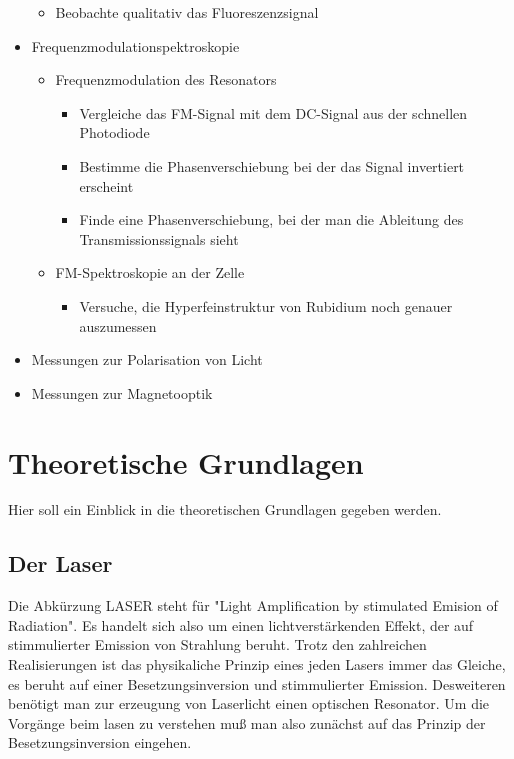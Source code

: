 \documentclass[12pt]{article}
\begin{document}
\begin{itemize}
\begin{itemize}
   \item Beobachte qualitativ das Fluoreszenzsignal
  \end{itemize}
 \item Frequenzmodulationspektroskopie
  \begin{itemize}
   \item Frequenzmodulation des Resonators
  \begin{itemize}
   \item Vergleiche das FM-Signal mit dem DC-Signal aus der schnellen Photodiode
   \item Bestimme die Phasenverschiebung bei der das Signal invertiert erscheint
   \item Finde eine Phasenverschiebung, bei der man die Ableitung des Transmissionssignals sieht
  \end{itemize}
   \item FM-Spektroskopie an der Zelle
  \begin{itemize}
   \item Versuche, die Hyperfeinstruktur von Rubidium noch genauer auszumessen
  \end{itemize}
  \end{itemize}
  \item Messungen zur Polarisation von Licht
  \item Messungen zur Magnetooptik
\end{itemize}
\newpage

\section{Theoretische Grundlagen}
Hier soll ein Einblick in die theoretischen Grundlagen gegeben werden.
\subsection{Der Laser}
Die Abkürzung LASER steht für "Light Amplification by stimulated Emision of Radiation". Es handelt sich also um einen lichtverstärkenden Effekt, der auf stimmulierter Emission von Strahlung beruht. Trotz den zahlreichen Realisierungen ist das physikaliche Prinzip eines jeden Lasers immer das Gleiche, es beruht auf einer Besetzungsinversion und stimmulierter Emission. Desweiteren benötigt man zur erzeugung von Laserlicht einen optischen Resonator. Um die Vorgänge beim lasen zu verstehen muß man also zunächst auf das Prinzip der Besetzungsinversion eingehen.
\end{document}
